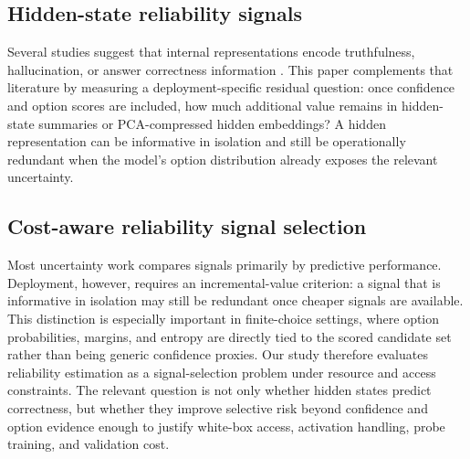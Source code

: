 \documentclass[preprint,12pt,authoryear]{elsarticle}
\begin{document}
\subsection{Hidden-state reliability signals}
Several studies suggest that internal representations encode truthfulness, hallucination, or answer correctness information \citep{chen2024inside,orgad2024llms,ji2024internal}. This paper complements that literature by measuring a deployment-specific residual question: once confidence and option scores are included, how much additional value remains in hidden-state summaries or PCA-compressed hidden embeddings? A hidden representation can be informative in isolation and still be operationally redundant when the model's option distribution already exposes the relevant uncertainty.


\subsection{Cost-aware reliability signal selection}
Most uncertainty work compares signals primarily by predictive performance. Deployment, however, requires an incremental-value criterion: a signal that is informative in isolation may still be redundant once cheaper signals are available. This distinction is especially important in finite-choice settings, where option probabilities, margins, and entropy are directly tied to the scored candidate set rather than being generic confidence proxies. Our study therefore evaluates reliability estimation as a signal-selection problem under resource and access constraints. The relevant question is not only whether hidden states predict correctness, but whether they improve selective risk beyond confidence and option evidence enough to justify white-box access, activation handling, probe training, and validation cost.
\end{document}
